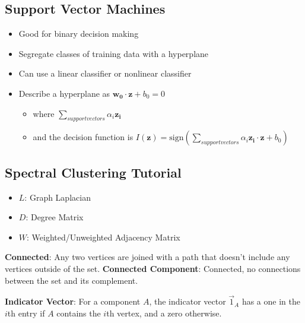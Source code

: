 \documentclass{article}
\begin{document}
{\begin{itemize}
        \end{itemize}
        \subsection{Support Vector Machines}
        \begin{itemize}
            \item Good for binary decision making
            \item Segregate classes of training data with a hyperplane
            \item Can use a linear classifier or nonlinear classifier    
            \item Describe a hyperplane as \ensuremath{\mathbf{w_0}\cdot\mathbf{z} +
b_0 = 0}
        
            \begin{itemize}
                \item where \begin{math}\sum_{support vectors}{\alpha_i\mathbf{z_i}}
\end{math}
                \item and the decision function is \begin{math}I(\mathbf{z}) =
\text{sign}\left(\sum_{support vectors}{\alpha_i\mathbf{z_i}\cdot\mathbf{z}+
b_0}\right) \end{math}
            \end{itemize}
        \end{itemize} 

        \subsection{Spectral Clustering Tutorial}   
        \begin{itemize}
            \item \textbf{\ensuremath{L}}: Graph Laplacian
            \item \textbf{\ensuremath{D}}: Degree Matrix
            \item \textbf{\ensuremath{W}}: Weighted/Unweighted Adjacency Matrix
        \end{itemize}
        \textbf{Connected}: Any two vertices are joined with a path that doesn't
include any vertices outside of the set.
        \textbf{Connected Component}: Connected, no connections between the set and
its complement. 

        \textbf{Indicator Vector}: For a component \ensuremath{A}, the indicator
vector \ensuremath{\vec{1}_{A}} has a one in the \ensuremath{i}th entry if
\ensuremath{A} contains the \ensuremath{i}th vertex, and a zero otherwise.
}
\end{document}
